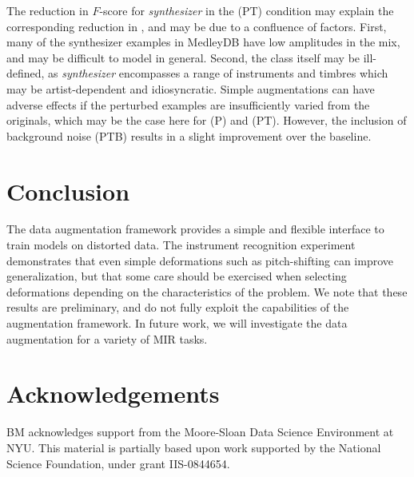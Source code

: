 \documentclass{article}
\begin{document}
The reduction in $F$-score for \emph{synthesizer} in the (PT) condition may 
explain the corresponding reduction in , and may be due
to a confluence of factors.
First, many of the synthesizer examples in MedleyDB have low amplitudes in the mix, 
and may be difficult to model in general.
Second, the class itself may be ill-defined, 
as \emph{synthesizer} encompasses a range of instruments and timbres which may be
artist-dependent and idiosyncratic.
Simple augmentations can have adverse effects if the
perturbed examples are insufficiently varied from the originals, which may be the case
here for (P) and (PT).
However, the inclusion of background noise (PTB) results in a slight improvement over
the baseline.

\section{Conclusion}

The data augmentation framework provides a simple and flexible
interface to train models on distorted data.
The instrument recognition experiment demonstrates that even simple deformations
such as pitch-shifting can improve generalization, but that some
care should be exercised when selecting deformations depending on the
characteristics of the problem.
We note that these results are preliminary, and do not fully exploit the capabilities of the
augmentation framework.
In future work, we will investigate the data augmentation for a variety of MIR tasks.

\section{Acknowledgements}
BM acknowledges support from the Moore-Sloan Data Science Environment at NYU.\@
This material is partially based upon work supported by the National Science Foundation, under grant
IIS-0844654.


\end{document}
